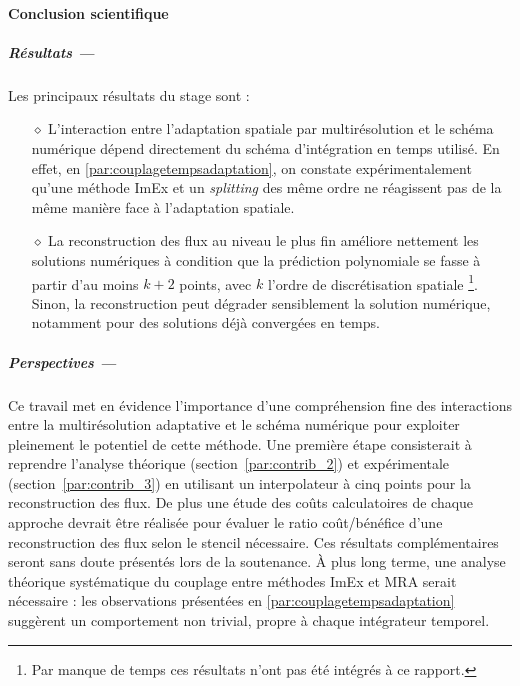 \label{par:cc}
\paragraph*{Conclusion scientifique}\label{par:cc1}
\subparagraph*{Résultats —}  
Les principaux résultats du stage sont : 
\begin{itemize}
    \item[$\diamond$] L'interaction entre l'adaptation spatiale par multirésolution et le schéma numérique dépend directement du schéma d'intégration en temps utilisé.
    En effet, en \ref{par:couplagetempsadaptation}, on constate expérimentalement qu'une méthode ImEx et un \emph{splitting} des même ordre ne réagissent pas de la même manière face à l'adaptation spatiale.
    
    \item[$\diamond$] La reconstruction des flux au niveau le plus fin améliore nettement les solutions numériques à condition que la prédiction polynomiale 
    se fasse à partir d'au moins \(k+2\) points, avec \(k\) l'ordre de discrétisation spatiale \footnote{Par manque de temps ces résultats n'ont pas été intégrés à ce rapport.}.
    Sinon, la reconstruction peut dégrader sensiblement la solution numérique, notamment pour des solutions déjà convergées en temps.
\end{itemize}

\medskip
\subparagraph*{Perspectives —}  
Ce travail met en évidence l'importance d'une compréhension fine des interactions 
entre la multirésolution adaptative et le schéma numérique pour exploiter pleinement le potentiel de cette méthode.  
Une première étape consisterait à reprendre l'analyse théorique (section~\ref{par:contrib_2}) 
et expérimentale (section~\ref{par:contrib_3}) en utilisant un interpolateur à cinq points pour la reconstruction des flux.
De plus une étude des coûts calculatoires de chaque approche devrait être réalisée
pour évaluer le ratio coût/bénéfice d'une reconstruction des flux selon le stencil nécessaire.
Ces résultats complémentaires seront sans doute présentés lors de la soutenance.  
À plus long terme, une analyse théorique systématique du couplage entre méthodes ImEx et MRA serait nécessaire : les observations présentées en \ref{par:couplagetempsadaptation} suggèrent un comportement non trivial, propre à chaque intégrateur temporel.

